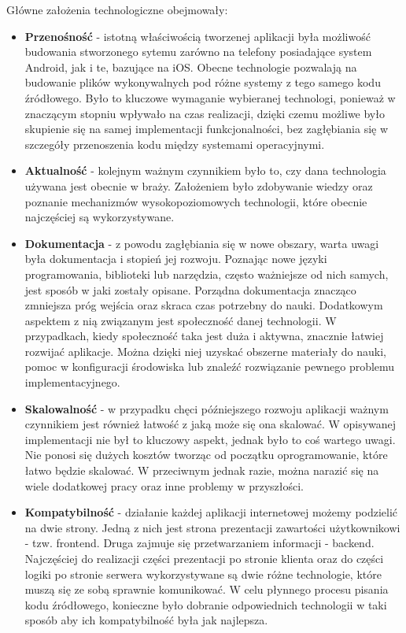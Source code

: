 Główne założenia technologiczne obejmowały:
\begin{itemize}
    \item \textbf{Przenośność} - istotną właściwością tworzenej aplikacji była
    możliwość budowania stworzonego sytemu zarówno na telefony posiadające
    system Android, jak i te, bazujące na iOS. Obecne technologie pozwalają na
    budowanie plików wykonywalnych pod różne systemy z tego samego kodu
    źródłowego. Było to kluczowe wymaganie wybieranej technologi, ponieważ w
    znaczącym stopniu wpływało na czas realizacji, dzięki czemu możliwe było
    skupienie się na samej implementacji funkcjonalności, bez zagłębiania się w
    szczegóły przenoszenia kodu między systemami operacyjnymi.
    \item \textbf{Aktualność} - kolejnym ważnym czynnikiem było to, czy dana
    technologia używana jest obecnie w braży. Założeniem było zdobywanie wiedzy
    oraz poznanie mechanizmów wysokopoziomowych technologii, które obecnie
    najczęściej są wykorzystywane.
    \item \textbf{Dokumentacja} - z powodu zagłębiania się w nowe obszary, warta
    uwagi była dokumentacja i stopień jej rozwoju. Poznając nowe języki
    programowania, biblioteki lub narzędzia, często ważniejsze od nich samych,
    jest sposób w jaki zostały opisane. Porządna dokumentacja znacząco zmniejsza
    próg wejścia oraz skraca czas potrzebny do nauki. Dodatkowym aspektem z nią
    związanym jest społeczność danej technologii. W przypadkach, kiedy
    społeczność taka jest duża i aktywna, znacznie łatwiej rozwijać aplikacje.
    Można dzięki niej uzyskać obszerne materiały do nauki, pomoc w konfiguracji
    środowiska lub znaleźć rozwiązanie pewnego problemu implementacyjnego.
    \item \textbf{Skalowalność} - w przypadku chęci późniejszego rozwoju
    aplikacji ważnym czynnikiem jest również łatwość z jaką może się ona
    skalować. W opisywanej implementacji nie był to kluczowy aspekt, jednak było
    to coś wartego uwagi. Nie ponosi się dużych kosztów tworząc od początku
    oprogramowanie, które łatwo będzie skalować. W przeciwnym jednak razie,
    można narazić się na wiele dodatkowej pracy oraz inne problemy w
    przyszłości.
    \item \textbf{Kompatybilność} - działanie każdej aplikacji internetowej
    możemy podzielić na dwie strony. Jedną z nich jest strona prezentacji
    zawartości użytkownikowi - tzw. frontend. Druga zajmuje się przetwarzaniem
    informacji - backend. Najczęściej do realizacji części prezentacji po
    stronie klienta oraz do części logiki po stronie serwera wykorzystywane są
    dwie różne technologie, które muszą się ze sobą sprawnie komunikować. W celu
    płynnego procesu pisania kodu źródłowego, konieczne było dobranie
    odpowiednich technologii w taki sposób aby ich kompatybilność była jak
    najlepsza.
\end{itemize}

